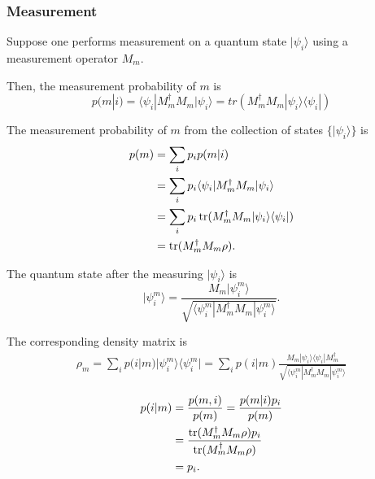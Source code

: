 \subsubsection{Measurement}

Suppose one performs measurement on a quantum state $|\psi_i\rangle$ using a measurement operator $M_m$. 

Then, the measurement probability of $m$ is 
\begin{equation}
  p(m|i) = \langle\psi_i|M^{\dagger}_m M_m|\psi_i\rangle = tr(M^{\dagger}_m M_m|\psi_i\rangle\langle\psi_i|)
\end{equation}

The measurement probability of $m$ from the collection of states $\{|\psi_i\rangle\}$ is 
\begin{equation}
  \begin{split}
    p(m) &= \sum_i p_i p(m|i) \\ 
    &= \sum_i p_i \langle\psi_i|M^{\dagger}_m M_m|\psi_i\rangle \\
    &= \sum_i p_i \operatorname{tr}(M^{\dagger}_m M_m|\psi_i\rangle\langle\psi_i|) \\
    &= \operatorname{tr}(M^{\dagger}_m M_m \rho).
  \end{split}
\end{equation}

The quantum state after the measuring $|\psi_i\rangle$ is 
\begin{equation}
  |\psi^m_i\rangle = \frac{M_m|\psi^m_i\rangle}{\sqrt{\langle \psi^m_i|M^{\dagger}_m M_m|\psi^m_i\rangle}}.
\end{equation}

The corresponding density matrix is
\begin{equation}
  \begin{split}
    \rho_m = \sum_i p(i|m)|\psi^m_i\rangle\langle\psi^m_i| = \sum_i p(i|m)\frac{M_m|\psi_i\rangle\langle\psi_i|M^{\dagger}_m}{\sqrt{\langle \psi^m_i|M^{\dagger}_m M_m|\psi^m_i\rangle}}
  \end{split}
\end{equation}

\begin{equation}
  \begin{split}
    p(i|m) &= \frac{p(m, i)}{p(m)} = \frac{p(m|i)p_i}{p(m)} \\
    &= \frac{\operatorname{tr}(M^{\dagger}_m M_m \rho) p_i}{\operatorname{tr}(M^{\dagger}_m M_m \rho)} \\
    &= p_i.
  \end{split}
\end{equation}

